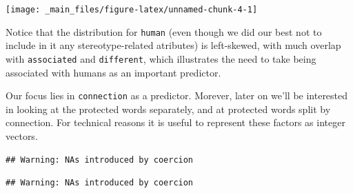 \documentclass[
  12pt,
]{book}
\newenvironment{Shaded}{\begin{snugshade}}{\end{snugshade}}
\newcommand{\FunctionTok}[1]{\textcolor[rgb]{0.00,0.00,0.00}{#1}}
\newcommand{\NormalTok}[1]{#1}
\newcommand{\OtherTok}[1]{\textcolor[rgb]{0.56,0.35,0.01}{#1}}
\newcommand{\SpecialCharTok}[1]{\textcolor[rgb]{0.00,0.00,0.00}{#1}}
\begin{document}
\vspace{1mm}
\footnotesize

\begin{center}\texttt{[image: \_main\_files/figure-latex/unnamed-chunk-4-1]} \end{center}
\normalsize

\noindent Notice that the distribution for \texttt{human} (even though we did our best not to include in it any stereotype-related atributes) is left-skewed, with much overlap with \texttt{associated} and \texttt{different}, which illustrates the need to take being associated with humans as an important predictor.

Our focus lies in \texttt{connection} as a predictor. Morever, later on we'll be interested in looking at the protected words separately, and at protected words split by connection. For technical reasons it is useful to represent these factors as integer vectors.

\vspace{1mm}
\footnotesize

\begin{Shaded}
\end{Shaded}

\begin{verbatim}
## Warning: NAs introduced by coercion
\end{verbatim}

\begin{Shaded}
\end{Shaded}

\begin{verbatim}
## Warning: NAs introduced by coercion
\end{verbatim}

\begin{Shaded}
\end{Shaded}
\end{document}
